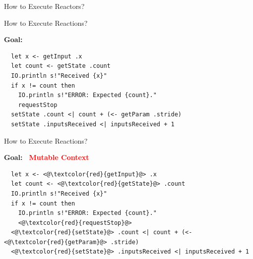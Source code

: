 \documentclass[aspectratio=169]{beamer}
\begin{document}
\begin{frame}{How to Execute Reactors?}




\end{frame}


\begin{frame}[fragile]{How to Execute Reactions?}

\pause

\textbf{Goal:}

\begin{lstlisting}
  let x <- getInput .x
  let count <- getState .count
  IO.println s!"Received {x}"  
  if x != count then
    IO.println s!"ERROR: Expected {count}."
    requestStop
  setState .count <| count + (<- getParam .stride)
  setState .inputsReceived <| inputsReceived + 1
\end{lstlisting}

\end{frame}


\begin{frame}[fragile]{How to Execute Reactions?}

\textbf{Goal: \textcolor{red}{\Lightning \, Mutable Context}}

\begin{lstlisting}
  let x <- <@\textcolor{red}{getInput}@> .x
  let count <- <@\textcolor{red}{getState}@> .count
  IO.println s!"Received {x}"  
  if x != count then
    IO.println s!"ERROR: Expected {count}."
    <@\textcolor{red}{requestStop}@>
  <@\textcolor{red}{setState}@> .count <| count + (<- <@\textcolor{red}{getParam}@> .stride)
  <@\textcolor{red}{setState}@> .inputsReceived <| inputsReceived + 1
\end{lstlisting}

\end{frame}
\end{document}
